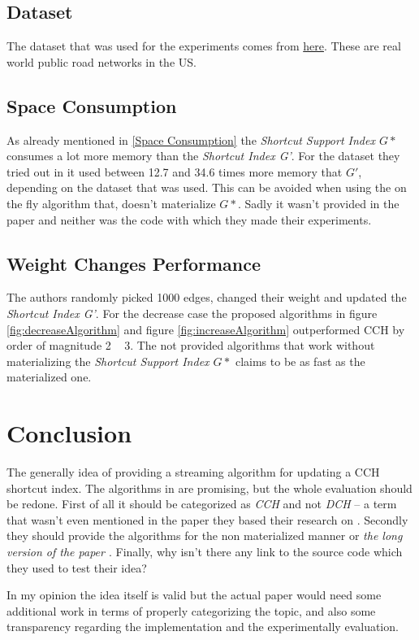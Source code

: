 \documentclass[twocolumn]{article}
\begin{document}
\subsection{Dataset}
The dataset that was used for the experiments comes from \href{http://www.dis.uniroma1.it/challenge9/download.shtml}{here}.
These are real world public road networks in the US.

\subsection{Space Consumption}

As already mentioned in \ref{Space Consumption} the \textit{Shortcut Support Index $G*$} consumes a lot more memory than 
the \textit{Shortcut Index G'}. For the dataset they tried out in \cite{Ouyang2020} it used between 12.7 and 34.6 times more
memory that $G'$, depending on the dataset that was used. This can be avoided when using the on the fly algorithm that, doesn't 
materialize $G*$. Sadly it wasn't provided in the paper and neither was the code with which they made their experiments.

\subsection{Weight Changes Performance}

The authors randomly picked 1000 edges, changed their weight and updated the \textit{Shortcut Index G'}. For the decrease case 
the proposed algorithms in figure \ref{fig:decreaseAlgorithm} and figure \ref{fig:increaseAlgorithm} outperformed 
CCH by order of magnitude 2 ~ 3. The not provided algorithms that work without materializing the \textit{Shortcut Support Index $G*$}
claims to be as fast as the materialized one.

\section{Conclusion}

The generally idea of providing a streaming algorithm for updating a CCH shortcut index. The algorithms in \cite{Ouyang2020} are
promising, but the whole evaluation should be redone. First of all it should be categorized as \textit{CCH} and not \textit{DCH} – a term that
wasn't even mentioned in the paper they based their research on \cite{Geisberger2012}. Secondly they should provide the 
algorithms for the non materialized manner or \textit{the long version of the paper \cite{Ouyang2020}}. Finally, why isn't there
any link to the source code which they used to test their idea?

In my opinion the idea itself is valid but the actual paper would need some additional work in terms of properly categorizing the topic,
and also some transparency regarding the implementation and the experimentally evaluation.

\newpage


 
\listoffigures

\newpage

 
 
\end{document}

